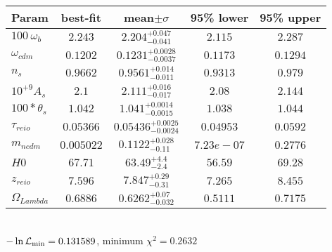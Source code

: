 \begin{tabular}{|l|c|c|c|c|} 
 \hline 
Param & best-fit & mean$\pm\sigma$ & 95\% lower & 95\% upper \\ \hline 
$100~\omega{}_{b }$ &$2.243$ & $2.204_{-0.041}^{+0.047}$ & $2.115$ & $2.287$ \\ 
$\omega{}_{cdm }$ &$0.1202$ & $0.1231_{-0.0037}^{+0.0028}$ & $0.1173$ & $0.1294$ \\ 
$n_{s }$ &$0.9662$ & $0.9561_{-0.011}^{+0.014}$ & $0.9313$ & $0.979$ \\ 
$10^{+9}A_{s }$ &$2.1$ & $2.111_{-0.017}^{+0.016}$ & $2.08$ & $2.144$ \\ 
$100*\theta{}_{s }$ &$1.042$ & $1.041_{-0.0015}^{+0.0014}$ & $1.038$ & $1.044$ \\ 
$\tau{}_{reio }$ &$0.05366$ & $0.05436_{-0.0024}^{+0.0025}$ & $0.04953$ & $0.0592$ \\ 
$m_{ncdm }$ &$0.005022$ & $0.1122_{-0.11}^{+0.028}$ & $7.23e-07$ & $0.2776$ \\ 
$H0$ &$67.71$ & $63.49_{-2.4}^{+4.4}$ & $56.59$ & $69.28$ \\ 
$z_{reio }$ &$7.596$ & $7.847_{-0.31}^{+0.29}$ & $7.265$ & $8.455$ \\ 
$\Omega{}_{Lambda }$ &$0.6886$ & $0.6262_{-0.032}^{+0.07}$ & $0.5111$ & $0.7175$ \\ 
\hline 
 \end{tabular} \\ 
$-\ln{\cal L}_\mathrm{min} =0.131589$, minimum $\chi^2=0.2632$ \\ 
